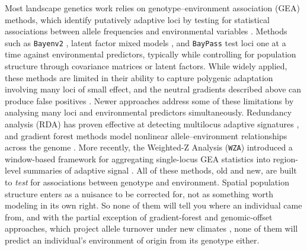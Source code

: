\documentclass[]{article}
\begin{document}
Most landscape genetics work relies on genotype--environment association
(GEA) methods, which identify putatively adaptive loci
by testing for statistical associations
between allele frequencies and environmental variables
\citep{rellstab_practical_2015}.
Methods such as \texttt{Bayenv2}
\citep{guenther_bayenv2_2013},
latent factor mixed models
\citep{frichot_lfmm_2013},
and \texttt{BayPass} \citep{gautier_baypass_2015}
test loci one at a time against environmental predictors,
typically while controlling for population structure
through covariance matrices or latent factors.
While widely applied, these methods
are limited in their ability to capture
polygenic adaptation involving many loci of small effect,
and the neutral gradients described above
can produce false positives
\citep{lotterhos_whitlock_2015}.
Newer approaches address some of these limitations
by analysing many loci and environmental predictors simultaneously.
Redundancy analysis (RDA) has proven effective
at detecting multilocus adaptive signatures
\citep{forester_comparing_2018, capblancq_rda_2021},
and gradient forest methods model
nonlinear allele--environment relationships
across the genome \citep{fitzpatrick_gradient_2015}.
More recently, the Weighted-Z Analysis (\texttt{WZA}) introduced
a window-based framework for aggregating
single-locus GEA statistics
into region-level summaries of adaptive signal
\citep{booker_wza_2024}.
All of these methods, old and new, are built to \emph{test}
for associations between genotype and environment.
Spatial population structure enters as a nuisance
to be corrected for, not as something worth modeling in its own right.
So none of them will tell you where an individual came from,
and with the partial exception of gradient-forest and genomic-offset
approaches, which project allele turnover under new climates
\citep{fitzpatrick_gradient_2015}, none of them will predict
an individual's environment of origin from its genotype either.
\end{document}
